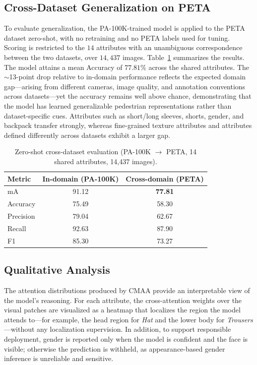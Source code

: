 \documentclass{ieeeaccess}
\begin{document}
\subsection{Cross-Dataset Generalization on PETA}
To evaluate generalization, the PA-100K-trained model is applied to the PETA dataset zero-shot, with no
retraining and no PETA labels used for tuning. Scoring is restricted to the $14$ attributes with an
unambiguous correspondence between the two datasets, over $14{,}437$ images.
Table~\ref{tab:crossdataset} summarizes the results. The model attains a mean Accuracy of
$\mathbf{77.81\%}$ across the shared attributes. The $\sim$13-point drop relative to in-domain
performance reflects the expected domain gap---arising from different cameras, image quality, and
annotation conventions across datasets---yet the accuracy remains well above chance, demonstrating that
the model has learned generalizable pedestrian representations rather than dataset-specific cues.
Attributes such as short/long sleeves, shorts, gender, and backpack transfer strongly, whereas
fine-grained texture attributes and attributes defined differently across datasets exhibit a larger gap.

\begin{table}[htbp]
\centering
\caption{Zero-shot cross-dataset evaluation (PA-100K $\rightarrow$ PETA, 14 shared attributes, 14{,}437 images).}
\label{tab:crossdataset}
\begin{tabular}{|l|c|c|}
\hline
\rowcolor{blue!15}
\textbf{Metric} & \textbf{In-domain (PA-100K)} & \textbf{Cross-domain (PETA)} \\ \hline
mA        & 91.12 & \textbf{77.81} \\ \hline
Accuracy  & 75.49 & 58.30 \\ \hline
Precision & 79.04 & 62.67 \\ \hline
Recall    & 92.63 & 87.90 \\ \hline
F1        & 85.30 & 73.27 \\ \hline
\end{tabular}
\end{table}

\subsection{Qualitative Analysis}
The attention distributions produced by CMAA provide an interpretable view of the model's reasoning.
For each attribute, the cross-attention weights over the visual patches are visualized as a heatmap
that localizes the region the model attends to---for example, the head region for \textit{Hat} and the
lower body for \textit{Trousers}---without any localization supervision. In addition, to support
responsible deployment, gender is reported only when the model is confident and the face is visible;
otherwise the prediction is withheld, as appearance-based gender inference is unreliable and sensitive.
\end{document}

